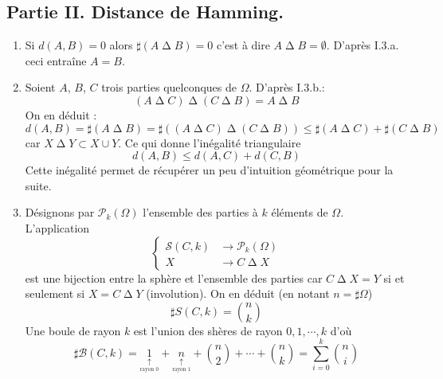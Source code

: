 \subsection*{Partie II. Distance de Hamming.}
\begin{enumerate}
 \item Si $d(A,B)=0$ alors $\sharp (A \mathop{\Delta}  B)=0$ c'est à dire $A \mathop{\Delta}  B=\emptyset$. D'après I.3.a. ceci entraîne $A=B$.

 \item Soient $A$, $B$, $C$ trois parties quelconques de $\Omega$. D'après I.3.b.:
\begin{displaymath}
\left(A \mathop{\Delta}  C \right) \mathop{\Delta}  \left(C \mathop{\Delta}  B \right)
= A \mathop{\Delta}  B
\end{displaymath}
On en déduit :
\begin{displaymath}
 d(A,B)=\sharp(A \mathop{\Delta}  B)=\sharp\left(\left(A \mathop{\Delta}  C \right) \mathop{\Delta}  \left(C \mathop{\Delta}  B \right) \right)
\leq  \sharp \left(A \mathop{\Delta}  C \right)+ \sharp\left(C \mathop{\Delta}  B \right)
\end{displaymath}
car $X \mathop{\Delta}  Y\subset X \cup Y$. Ce qui donne l'inégalité triangulaire
\begin{displaymath}
 d(A,B)\leq d(A,C) + d(C,B)
\end{displaymath}
Cette inégalité permet de récupérer un peu d'intuition géométrique pour la suite. 

\item Désignons par $\mathcal P_k(\Omega)$ l'ensemble des parties à $k$ éléments de $\Omega$. L'application
\begin{displaymath}
 \left\lbrace 
\begin{aligned}
 \mathcal S(C,k) &\rightarrow \mathcal P_k(\Omega)\\
X &\rightarrow C \mathop{\Delta}  X
\end{aligned}
\right. 
\end{displaymath}
est une bijection entre la sphère et l'ensemble des parties car $C \mathop{\Delta}  X=Y$ si et seulement si $X=C \mathop{\Delta}  Y$ (involution). On en déduit (en notant $n = \sharp \Omega$)
\begin{displaymath}
 \sharp S(C,k) = \binom{n}{k}
\end{displaymath}
Une boule de rayon $k$ est l'union des shères de rayon $0, 1, \cdots,k$ d'où
\begin{displaymath}
\sharp \mathcal B(C,k) = \underset{\underset{\text{rayon $0$}}{\uparrow}}{1} + \underset{\underset{\text{rayon $1$}}{\uparrow}}{n} + \binom{n}{2}+\cdots + \binom{n}{k} = \sum_{i=0}^{k}\binom{n}{i}
\end{displaymath}
\end{enumerate}

